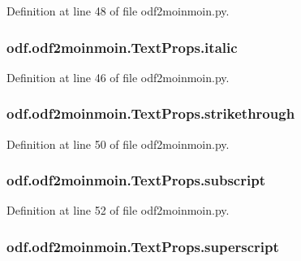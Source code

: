 Definition at line 48 of file odf2moinmoin.\+py.

\hypertarget{classodf_1_1odf2moinmoin_1_1TextProps_af85a0ebd5c214065777718be7a8df19a}{
\subsubsection[{italic}]{\setlength{\rightskip}{0pt plus 5cm}odf.\+odf2moinmoin.\+Text\+Props.\+italic}}\label{classodf_1_1odf2moinmoin_1_1TextProps_af85a0ebd5c214065777718be7a8df19a}


Definition at line 46 of file odf2moinmoin.\+py.

\hypertarget{classodf_1_1odf2moinmoin_1_1TextProps_aa1880b520d5ce2db420658a2a1dd16e7}{
\subsubsection[{strikethrough}]{\setlength{\rightskip}{0pt plus 5cm}odf.\+odf2moinmoin.\+Text\+Props.\+strikethrough}}\label{classodf_1_1odf2moinmoin_1_1TextProps_aa1880b520d5ce2db420658a2a1dd16e7}


Definition at line 50 of file odf2moinmoin.\+py.

\hypertarget{classodf_1_1odf2moinmoin_1_1TextProps_a5c6f7ea5895085c1facc09c796eecbcc}{
\subsubsection[{subscript}]{\setlength{\rightskip}{0pt plus 5cm}odf.\+odf2moinmoin.\+Text\+Props.\+subscript}}\label{classodf_1_1odf2moinmoin_1_1TextProps_a5c6f7ea5895085c1facc09c796eecbcc}


Definition at line 52 of file odf2moinmoin.\+py.

\hypertarget{classodf_1_1odf2moinmoin_1_1TextProps_a36c85d769680a75b8fdc17c5f8a03a2a}{
\subsubsection[{superscript}]{\setlength{\rightskip}{0pt plus 5cm}odf.\+odf2moinmoin.\+Text\+Props.\+superscript}}\label{classodf_1_1odf2moinmoin_1_1TextProps_a36c85d769680a75b8fdc17c5f8a03a2a}


